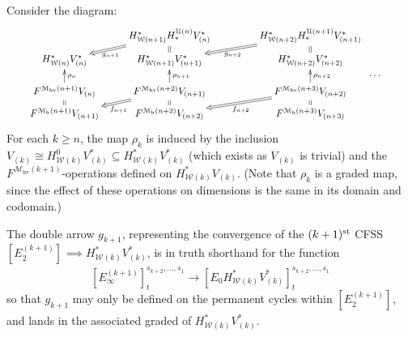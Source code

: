 \documentclass[11pt]{amsart} \renewcommand{\baselinestretch}{1.2}
\theoremstyle{plain}
\numberwithin{equation}{section} %
\theoremstyle{plain}
\numberwithin{equation}{chapter} %
\renewcommand{\to}{\longrightarrow}
\newcommand{\calU}{\mathcal{U}}
\newcommand{\calw}{\mathcal{W}}
\newcommand{\calMh}{\mathcal{M}\dhor}
\newcommand{\calMhv}{\mathcal{M}_\mathrm{hv}}
\newcommand{\E}[5]{[E^{#1}_{#2}#3]^{#4}_{#5}}
\newcommand{\dhor}{_\mathrm{h}}
\newcommand{\CFSS}{CFSS}
\begin{document}
\begin{Calculations of HWn}
Consider the diagram:
\[\qquad\xymatrix@R=1.5mm{
&
H^*_{\calw({n+1})}H_*^{\calU(n)}V^*_{(n)}\ar@{=>}[dl]^-{g_{n+1}}\ar@{=}[d]&
H^*_{\calw({n+2})}H_*^{\calU({n+1})}V^*_{({n+1})}\ar@{=>}[dl]^-{g_{n+2}}\ar@{=}[d]&
\\
 H^*_{\calw(n)}V^*_{(n)}
&H^*_{\calw({n+1})}V^*_{({n+1})}
&H^*_{\calw({n+2})}V^*_{({n+2})}
\\
&&\makebox[5cm][r]{\,$\smash{\cdots }$}
\\
 F^{\calMhv({n+1})}V_{(n)}\ar[uu]_-{\rho_n}\ar@{=}[d]
&F^{\calMhv({n+2})}V_{({n+1})}\ar[uu]_-{\rho_{n+1}}\ar@{=}[d]\ar@{=>}[ld]^-{f_{n+1}}
&F^{\calMhv({n+3})}V_{({n+2})}\ar[uu]_-{\rho_{n+2}}\ar@{=}[d]\ar@{=>}[ld]^-{f_{n+2}}
\\
 F^{\calMh({n+1})}V_{({n+1})}
&F^{\calMh({n+2})}V_{({n+2})}
&F^{\calMh({n+3})}V_{({n+3})}
}\]
For each $k\geq n$, the map $\rho_k$ is induced by the inclusion $V_{(k)}\cong H^{0}_{\calw(k)}V^*_{(k)}\subseteq H^*_{\calw(k)}V^*_{(k)}$ (which exists as $V_{(k)}$ is trivial) and the $F^{\calMhv(k+1)}$-operations defined on $H^*_{\calw(k)}V_{(k)}$. (Note that $\rho_{k}$ is a graded map, since the effect of these operations on dimensions is the same in its domain and codomain.)

The double arrow $g_{k+1}$, representing the convergence of the $(k+1)^{\textup{st}}$ \CFSS\ $\E{(k+1)}{2}{}{}{}\implies H^*_{\calw(k)}V^*_{(k)}$, is in truth shorthand for the function
\[\E{(k+1)}{\infty}{}{s_{k+2},\ldots,s_1}{t}\to \E{}{0}{H^*_{\calw(k)}V^*_{(k)}}{s_{k+2},\ldots,s_1}{t} \]
so that $g_{k+1}$ may only be defined on the permanent cycles within $\E{(k+1)}{2}{}{}{}$, %
 and lands in the associated graded of $H^*_{\calw(k)}V^*_{(k)}$.


\end{Calculations of HWn}
\end{document}

